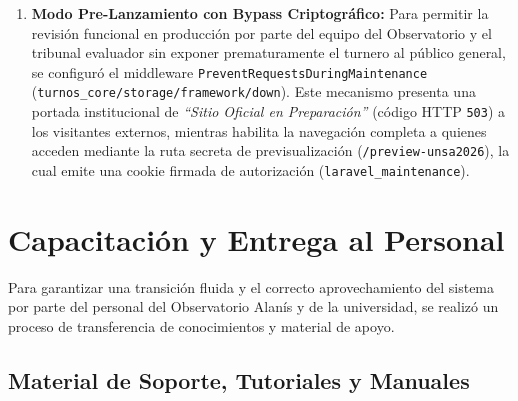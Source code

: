\begin{enumerate}
    \item \textbf{Modo Pre-Lanzamiento con Bypass Criptográfico:} Para permitir la revisión funcional en producción por parte del equipo del Observatorio y el tribunal evaluador sin exponer prematuramente el turnero al público general, se configuró el middleware \texttt{PreventRequestsDuringMaintenance} (\texttt{turnos\_core/storage/framework/down}). Este mecanismo presenta una portada institucional de \textit{``Sitio Oficial en Preparación''} (código HTTP \texttt{503}) a los visitantes externos, mientras habilita la navegación completa a quienes acceden mediante la ruta secreta de previsualización (\texttt{/preview-unsa2026}), la cual emite una cookie firmada de autorización (\texttt{laravel\_maintenance}).
\end{enumerate}

\section{Capacitación y Entrega al Personal}

Para garantizar una transición fluida y el correcto aprovechamiento del sistema por parte del personal del Observatorio Alanís y de la universidad, se realizó un proceso de transferencia de conocimientos y material de apoyo.

\subsection{Material de Soporte, Tutoriales y Manuales}

